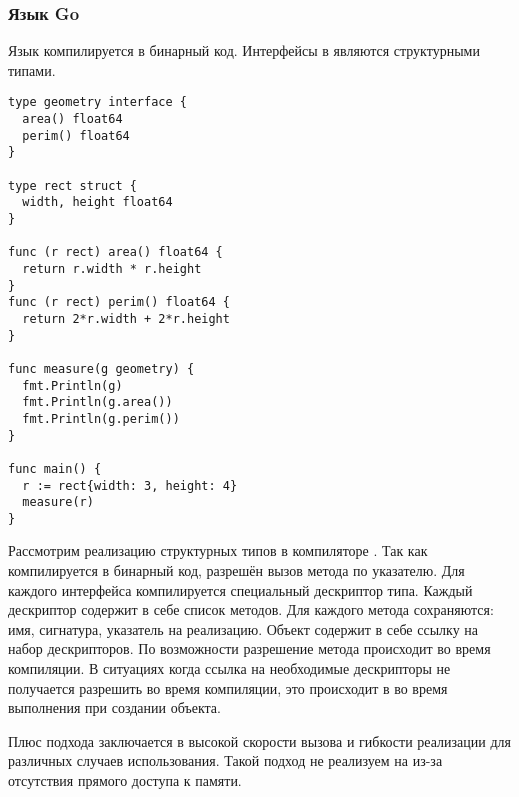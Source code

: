 \subsubsection{Язык Go}
Язык  компилируется в бинарный код. Интерфейсы в  являются структурными типами\cite{go}.

\begin{verbatim}
type geometry interface {
  area() float64
  perim() float64
}

type rect struct {
  width, height float64
}

func (r rect) area() float64 {
  return r.width * r.height
}
func (r rect) perim() float64 {
  return 2*r.width + 2*r.height
}

func measure(g geometry) {
  fmt.Println(g)
  fmt.Println(g.area())
  fmt.Println(g.perim())
}

func main() {
  r := rect{width: 3, height: 4}
  measure(r)
}
\end{verbatim}

Рассмотрим реализацию структурных типов в компиляторе . Так как  компилируется в бинарный код, разрешён вызов метода по указателю. Для каждого интерфейса компилируется специальный дескриптор типа. Каждый дескриптор содержит в себе список методов. Для каждого метода сохраняются: имя, сигнатура, указатель на реализацию. Объект содержит в себе ссылку на набор дескрипторов. По возможности разрешение метода происходит во время компиляции. В ситуациях когда ссылка на необходимые дескрипторы не получается разрешить во время компиляции, это происходит в во время выполнения при создании объекта.

Плюс подхода заключается в высокой скорости вызова и гибкости реализации для различных случаев использования. Такой подход не реализуем на  из-за отсутствия прямого доступа к памяти.
